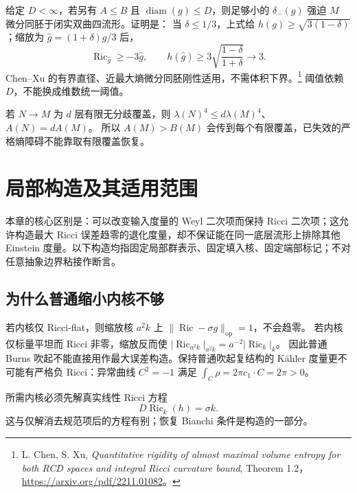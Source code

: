 \documentclass[UTF8,fontset=fandol,zihao=-4,oneside,openany]{ctexbook}
\theoremstyle{cjkplain}
\numberwithin{equation}{chapter}
\DeclareMathOperator{\Ric}{Ric}
\begin{document}
给定 \(D<\infty\)，若另有 \(A\le B\) 且 \(\operatorname{diam}(g)\le D\)，则足够小的 \(\delta_-(g)\) 强迫 \(M\) 微分同胚于闭实双曲四流形。证明是：
当 \(\delta\le1/3\)，上式给 \(h(g)\ge\sqrt{3(1-\delta)}\)；缩放为
\(\widehat g=(1+\delta)g/3\) 后，
\[
\Ric_{\widehat g}\ge-3\widehat g,\qquad
h(\widehat g)\ge3\sqrt{\frac{1-\delta}{1+\delta}}\to3.
\]
Chen--Xu 的有界直径、近最大熵微分同胚刚性适用，不需体积下界。\footnote{L. Chen, S. Xu, \emph{Quantitative rigidity of almost maximal volume entropy for both RCD spaces and integral Ricci curvature bound}, Theorem 1.2，\url{https://arxiv.org/pdf/2211.01082}。}
阈值依赖 \(D\)，不能换成维数统一阈值。

若 \(N\to M\) 为 \(d\) 层有限无分歧覆盖，则
\(\lambda(N)^4\le d\lambda(M)^4\)、\(A(N)=dA(M)\)。
所以 \(A(M)>B(M)\) 会传到每个有限覆盖，已失效的严格熵障碍不能靠取有限覆盖恢复。

\chapter{局部构造及其适用范围}\label{FND:constructionchapter}
本章的核心区别是：可以改变输入度量的 Weyl 二次项而保持 Ricci 二次项；这允许构造最大 Ricci 误差趋零的退化度量，却不保证能在同一底层流形上排除其他 Einstein 度量。以下构造均指固定局部群表示、固定填入核、固定端部标记；不对任意抽象边界粘接作断言。

\section{为什么普通缩小内核不够}
若内核仅 Ricci-flat，则缩放核 \(a^2k\) 上
\(\|\Ric-\sigma g\|_{\operatorname{op}}=1\)，不会趋零。
若内核仅标量平坦而 Ricci 非零，缩放反而使
\(|\Ric_{a^2k}|_{a^2k}=a^{-2}|\Ric_k|_k\)。
因此普通 Burns 吹起不能直接用作最大误差构造。保持普通吹起复结构的 Kähler 度量更不可能有严格负 Ricci：异常曲线 \(C^2=-1\) 满足
\(\int_C\rho=2\pi c_1\cdot C=2\pi>0\)。

所需内核必须先解真实线性 Ricci 方程
\begin{equation}\label{FND:innerlinear}
D\Ric_k(h)=\sigma k.
\end{equation}
这与仅解消去规范项后的方程有别；恢复 Bianchi 条件是构造的一部分。
\end{document}
